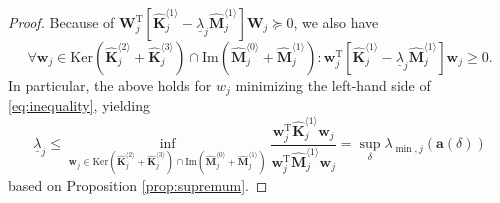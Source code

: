 \documentclass[10pt,a4paper]{amsart}
\begin{document}
\begin{proof}
Because of $\mathbf{W}_j^\mathrm{T}\left[\hat{\mathbf{K}}_{j}^{\langle 1\rangle} - \underline{\lambda}_j \hat{\mathbf{M}}_{j}^{\langle 1\rangle} \right]\mathbf{W}_j \succeq 0$, we also have
%
\begin{equation}\label{eq:inequality}
	\forall \mathbf{w}_j \in \mathrm{Ker}\left(\hat{\mathbf{K}}_j^{\langle 2\rangle} + \hat{\mathbf{K}}_j^{\langle 3\rangle}\right) \cap \mathrm{Im}\left(\hat{\mathbf{M}}_j^{\langle 0\rangle} + \hat{\mathbf{M}}_j^{\langle 1\rangle}\right):  \mathbf{w}_j^\mathrm{T} \left[\hat{\mathbf{K}}_{j}^{\langle 1\rangle} - \underline{\lambda}_j \hat{\mathbf{M}}_{j}^{\langle 1\rangle} \right] \mathbf{w}_j \ge 0.
\end{equation}
%
In particular, the above holds for $w_j$ minimizing the left-hand side of \eqref{eq:inequality}, yielding
%
\begin{equation}
	\underline{\lambda}_j \le \inf_{\mathbf{w}_j \in \mathrm{Ker}\left(\hat{\mathbf{K}}_j^{\langle 2\rangle} + \hat{\mathbf{K}}_j^{\langle 3\rangle}\right) \cap \mathrm{Im}\left(\hat{\mathbf{M}}_j^{\langle 0\rangle} + \hat{\mathbf{M}}_j^{\langle 1\rangle}\right)} \frac{\mathbf{w}_j^\mathrm{T} \hat{\mathbf{K}}_{j}^{\langle 1\rangle} \mathbf{w}_j}{\mathbf{w}_j^\mathrm{T} \hat{\mathbf{M}}_{j}^{\langle 1\rangle} \mathbf{w}_j} = \sup_{\delta} \lambda_{\min,j}(\mathbf{a}(\delta))
\end{equation}
%
based on Proposition \ref{prop:supremum}.
\end{proof}
\end{document}
